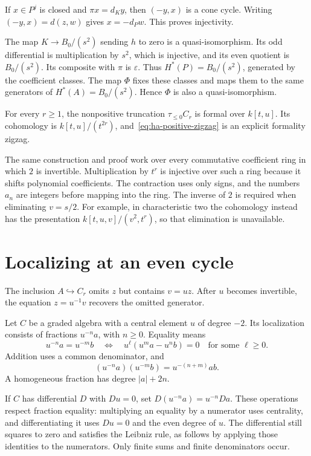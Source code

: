 If $x\in P^j$ is closed and $\pi x=d_Ky$, then $(-y,x)$ is a
cone cycle.
Writing $(-y,x)=d(z,w)$ gives $x=-d_Pw$.
This proves injectivity.

The map $K\to B_0/(s^2)$ sending $h$ to zero is a
quasi-isomorphism. Its odd differential is multiplication by $s^2$,
which is injective, and its even quotient is $B_0/(s^2)$.
Its composite with $\pi$ is $\varepsilon$.
Thus $H^*(P)=B_0/(s^2)$, generated by the coefficient classes.
The map $\Phi$ fixes these classes and maps them to the same
generators of $H^*(A)=B_0/(s^2)$. Hence $\Phi$ is also a
quasi-isomorphism.

\begin{theorem}\label{thm:ha-truncation-formal}
For every $r\geq1$, the nonpositive truncation $\tau_{\leq0}C_r$
is formal over $k[t,u]$. Its cohomology is $k[t,u]/(t^{2r})$,
and~\eqref{eq:ha-positive-zigzag} is an explicit formality zigzag.
\end{theorem}

The same construction and proof work over every commutative
coefficient ring in which $2$ is invertible.
Multiplication by $t^r$ is injective over such a ring because it
shifts polynomial coefficients. The contraction uses only signs,
and the numbers $a_n$ are integers before mapping into the ring.
The inverse of $2$ is required when eliminating $v=s/2$.
For example, in characteristic two the cohomology instead has the
presentation $k[t,u,v]/(v^2,t^r)$, so that elimination is unavailable.

\section{Localizing at an even cycle}
\label{sec:ha-localization}

The inclusion $A\hookrightarrow C_r$ omits $z$ but contains $v=uz$.
After $u$ becomes invertible, the equation $z=u^{-1}v$ recovers
the omitted generator.

Let $C$ be a graded algebra with a central element $u$ of degree $-2$.
Its localization consists of fractions $u^{-n}a$, with $n\geq0$.
Equality means
\[
 u^{-n}a=u^{-m}b
 \quad\Longleftrightarrow\quad
 u^\ell(u^ma-u^nb)=0
 \quad\text{for some }\ell\geq0.
\]
Addition uses a common denominator, and
\[
 (u^{-n}a)(u^{-m}b)=u^{-(n+m)}ab.
\]
A homogeneous fraction has degree $|a|+2n$.

If $C$ has differential $D$ with $Du=0$, set
$D(u^{-n}a)=u^{-n}Da$.
These operations respect fraction equality: multiplying an equality
by a numerator uses centrality, and differentiating it uses $Du=0$
and the even degree of $u$.
The differential still squares to zero and satisfies the Leibniz rule,
as follows by applying those identities to the numerators.
Only finite sums and finite denominators occur.

